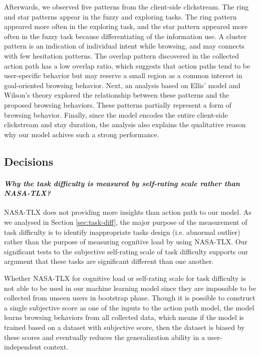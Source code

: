 Afterwards, we observed five patterns from the client-side clickstream. 
The ring and star patterns appear in the fuzzy and exploring tasks. 
The ring pattern appeared more often in the exploring task,
and the star pattern appeared more often in the fuzzy task 
because differentiating of the information use.
A cluster pattern is an indication of individual intent while browsing, and may connects
with few hesitation patterns.
The overlap pattern discovered in the collected action path has a low overlap ratio,
which suggests that action paths tend to be user-specific behavior but may reserve a small region as
a common interest in goal-oriented browsing behavior.
Next, an analysis based on Ellis' model and Wilson's theory explored the relationship 
between these patterns and the proposed browsing behaviors. These patterns partially represent a form of browsing behavior.
Finally, since the model encodes the entire client-side clickstream and stay duration,
the analysis also explains the qualitative reason why our model achives such a strong performance.

\subsection{Decisions}
\label{sec:decision}

\paragraph{\emph{Why the task difficulty is measured by self-rating scale rather than NASA-TLX?}}

NASA-TLX does not providing more insights than action path to our model.
As we analysed in Section \ref{sec:task-diff}, the major purpose of the measurement of 
task difficulty is to identify inappropriate tasks design (i.e. abnormal outlier) 
rather than the purpose of measuring cognitive load by using NASA-TLX.
Our significant tests to the subjective self-rating scale of task difficulty supports
our argument that these tasks are significant different than one another.

Whether NASA-TLX for cognitive load or self-rating scale for task difficulty is not able to be used in
our machine learning model since they are impossible to be collected from unseen users in bootstrap phase.
Though it is possible to construct a single subjective score as one of the inputs to the action path model,
the model learns browsing behaviors from all collected data, which means if the model is trained based on 
a dataset with subjective score, then the dataset is biased by these scores and eventually reduces the 
generalization ability in a user-independent context.

